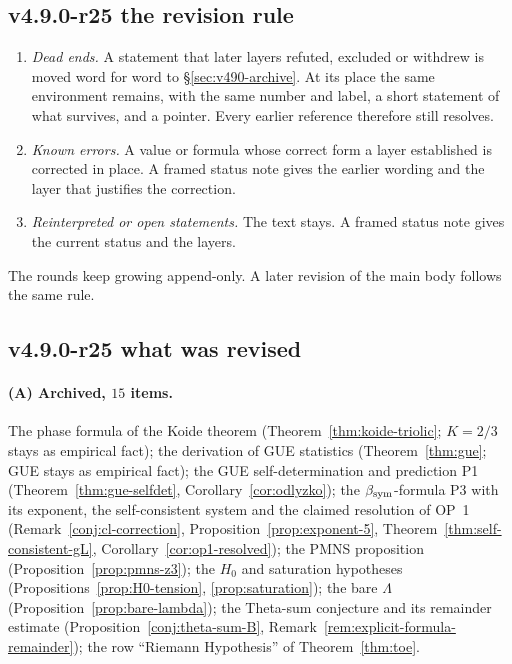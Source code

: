 \subsection*{v4.9.0-r25 the revision rule}
\label{subsec:v490-r25-rule}

\begin{enumerate}[leftmargin=2em]
\item[(A)] \emph{Dead ends.}  A statement that later layers refuted, excluded or withdrew is moved word for word to
\S\ref{sec:v490-archive}.  At its place the same environment remains, with the same number and label, a short statement of
what survives, and a pointer.  Every earlier reference therefore still resolves.
\item[(B)] \emph{Known errors.}  A value or formula whose correct form a layer established is corrected in place.  A framed
status note gives the earlier wording and the layer that justifies the correction.
\item[(C)] \emph{Reinterpreted or open statements.}  The text stays.  A framed status note gives the current status and the
layers.
\end{enumerate}
The rounds keep growing append-only.  A later revision of the main body follows the same rule.

\subsection*{v4.9.0-r25 what was revised}
\label{subsec:v490-r25-what}

\paragraph{(A) Archived, \(15\) items.}
The phase formula of the Koide theorem (Theorem~\ref{thm:koide-triolic}; \(K=2/3\) stays as empirical fact); the derivation of
GUE statistics (Theorem~\ref{thm:gue}; GUE stays as empirical fact); the GUE self-determination and prediction P1
(Theorem~\ref{thm:gue-selfdet}, Corollary~\ref{cor:odlyzko}); the \(\beta_{\mathrm{sym}}\)-formula P3 with its exponent, the self-consistent
system and the claimed resolution of OP~1 (Remark~\ref{conj:cl-correction}, Proposition~\ref{prop:exponent-5},
Theorem~\ref{thm:self-consistent-gL}, Corollary~\ref{cor:op1-resolved}); the PMNS proposition
(Proposition~\ref{prop:pmns-z3}); the \(H_0\) and saturation hypotheses (Propositions~\ref{prop:H0-tension},
\ref{prop:saturation}); the bare \(\Lambda\) (Proposition~\ref{prop:bare-lambda}); the Theta-sum conjecture and its remainder
estimate (Proposition~\ref{conj:theta-sum-B}, Remark~\ref{rem:explicit-formula-remainder}); the row ``Riemann Hypothesis'' of
Theorem~\ref{thm:toe}.

